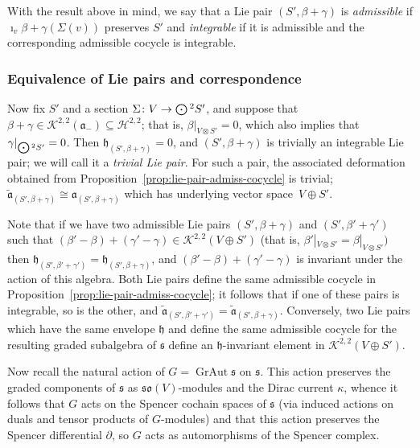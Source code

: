 \documentclass[pdftex]{sigma}
\numberwithin{equation}{section}
\newcommand{\fa}{\mathfrak{a}}
\newcommand{\fh}{\mathfrak{h}}
\newcommand{\fs}{\mathfrak{s}}
\newcommand{\fso}{\mathfrak{so}}
\newcommand{\cH}{\mathcal{H}}
\newcommand{\cK}{\mathcal{K}}
\newcommand{\fatilde}{\widetilde{\fa}}
\newcommand{\Odot}{\mathchoice{{\textstyle\bigodot}}{\bigodot}{\bigodot}{\bigodot}}
\newcommand{\1}{\mathbbm{1}}
\DeclareMathOperator{\GrAut}{GrAut}
\begin{document}
With the result above in mind, we say that a Lie pair $(S',\beta+\gamma)$ is \emph{admissible} if $\imath_v\beta+\gamma(\Sigma(v))$ preserves $S'$ and \emph{integrable} if it is admissible and the corresponding admissible cocycle is integrable.

\subsubsection{Equivalence of Lie pairs and correspondence}

Now fix $S'$ and a section $\Sigma\colon V\to\Odot^2S'$, and suppose that $\beta+\gamma\in\cK^{2,2}(\fa_-)\subseteq\cH^{2,2}$; that is, $\beta|_{V\otimes S'}=0$, which also implies that $\gamma|_{\Odot^2S'}=0$. Then $\fh_{(S',\beta+\gamma)}=0$, and $(S',\beta+\gamma)$ is trivially an integrable Lie pair; we will call it a \emph{trivial Lie pair}. For such a pair, the associated deformation obtained from Proposition~\ref{prop:lie-pair-admiss-cocycle} is trivial; $\fatilde_{(S',\beta+\gamma)}\cong\fa_{(S',\beta+\gamma)}$ which has underlying vector space~${V\oplus S'}$.

Note that if we have two admissible Lie pairs $(S',\beta+\gamma)$ and $(S',\beta'+\gamma')$ such that $(\beta'-\beta)+(\gamma'-\gamma)\in\cK^{2,2}(V\oplus S')$ (that is, $\beta'|_{V\otimes S'}=\beta|_{V\otimes S'})$ then $\fh_{(S',\beta'+\gamma')}=\fh_{(S',\beta+\gamma)}$, and $(\beta'-\beta)+(\gamma'-\gamma)$ is invariant under the action of this algebra. Both Lie pairs define the same admissible cocycle in Proposition~\ref{prop:lie-pair-admiss-cocycle}; it follows that if one of these pairs is integrable, so is the other, and $\fatilde_{(S',\beta'+\gamma')}=\fatilde_{(S',\beta+\gamma)}$. Conversely, two Lie pairs which have the same envelope $\fh$ and define the same admissible cocycle for the resulting graded subalgebra of $\fs$ define an $\fh$-invariant element in $\cK^{2,2}(V\oplus S')$.

Now recall the natural action of $G=\GrAut\fs$ on $\fs$. This action preserves the graded components of $\fs$ as $\fso(V)$-modules and the Dirac current $\kappa$, whence it follows that $G$ acts on the Spencer cochain spaces of $\fs$ (via induced actions on duals and tensor products of $G$-modules) and that this action preserves the Spencer differential $\partial$, so $G$ acts as automorphisms of the Spencer complex.
\end{document}
